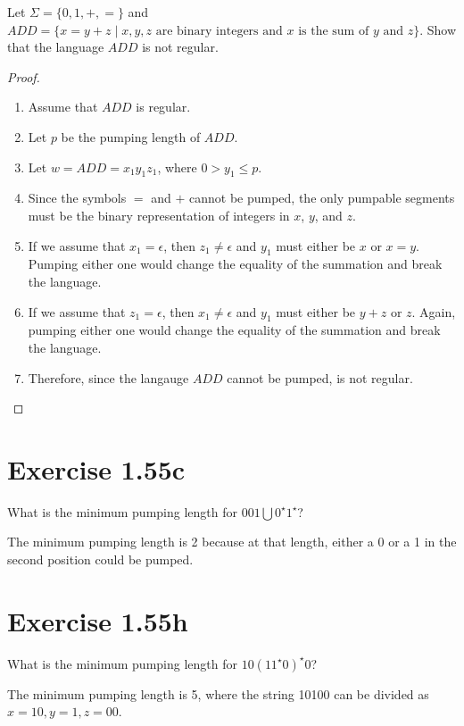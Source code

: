 \documentclass{article}
\newcommand{\union}{\bigcup}
\newcommand{\where}{\mid}
\begin{document}
Let $\Sigma = \{0, 1, +, =\}$ and $ADD = \{ x=y+z \where x, y, z \text{ are
binary integers and } x \text{ is the sum of } y \text{ and } z\}$. Show that
the language $ADD$ is not regular.

\begin{proof}
	\mbox{}
	\begin{enumerate}
	  \item Assume that $ADD$ is regular.
	  \item Let $p$ be the pumping length of $ADD$.
	  \item Let $w = ADD = x_1 y_1 z_1$, where $0 > y_1 \leq p$.
	  \item Since the symbols $=$ and $+$ cannot be pumped, the only pumpable
	  segments must be the binary representation of integers in $x$, $y$, and $z$.
	  \item If we assume that $x_1 = \epsilon$, then $z_1 \ne \epsilon$ and $y_1$
	  must either be $x$ or $x=y$. Pumping either one would change the equality
	  of the summation and break the language.
	  \item If we assume that $z_1 = \epsilon$, then $x_1 \ne \epsilon$ and $y_1$
	  must either be $y+z$ or $z$. Again, pumping either one would change the
	  equality of the summation and break the language.
  	  \item Therefore, since the langauge $ADD$ cannot be pumped, is not regular.
  	  \qedhere
	\end{enumerate}
\end{proof}

\section{Exercise 1.55c}

What is the minimum pumping length for $001 \union 0^\star1^\star$?

The minimum pumping length is 2 because at that length, either a 0 or a 1
in the second position could be pumped. 

\section{Exercise 1.55h}

What is the minimum pumping length for $10(11^\star0)^\star0$?

The minimum pumping length is 5, where the string 10100 can be divided as $x
= 10, y = 1, z = 00$.
\end{document}
